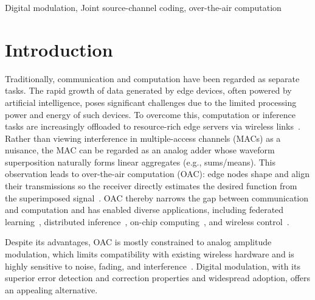\documentclass[journal,12pt,onecolumn,draftclsnofoot]{IEEEtran}
\theoremstyle{definition}
\begin{document}
\begin{IEEEkeywords}
 Digital modulation, Joint source-channel coding, over-the-air computation
\end{IEEEkeywords}


\section{Introduction}



Traditionally, communication and computation have been regarded as separate tasks. The rapid growth of data generated by edge devices, often powered by artificial intelligence, poses significant challenges due to the limited processing power and energy of such devices. To overcome this, computation or inference tasks are increasingly offloaded to resource-rich edge servers via wireless links~\cite{Guangxu2020edge,hellstrom2022wireless,gunduz2021communicate,perez2025waveforms}. Rather than viewing interference in multiple-access channels (MACs) as a nuisance, the MAC can be regarded as an analog adder whose waveform superposition naturally forms linear aggregates (e.g., sums/means). This observation leads to over-the-air computation (OAC): edge nodes shape and align their transmissions so the receiver directly estimates the desired function from the superimposed signal~\cite{nazer2007Computation,goldenbaum2014nomographic}. OAC thereby narrows the gap between communication and computation and has enabled diverse applications, including federated learning~\cite{razavikia2024blind,amiri2020federated,amiri2020machine,yang2020federated}, distributed inference~\cite{yilmaz2025private}, on-chip computing~\cite{guirado2023whype}, and wireless control~\cite{park2021optimized}.



Despite its advantages, OAC is mostly constrained to analog amplitude modulation, which limits compatibility with existing wireless hardware and is highly sensitive to noise, fading, and interference~\cite{csahin2023over,csahin2023survey}. Digital modulation, with its superior error detection and correction properties and widespread adoption, offers an appealing alternative.
\end{document}
